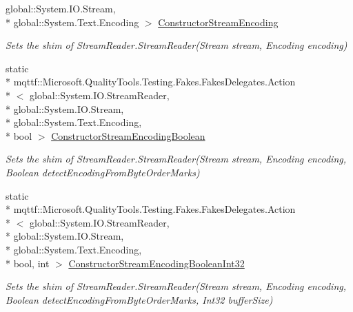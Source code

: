 \begin{DoxyCompactItemize}
global\-::\-System.\-I\-O.\-Stream, \\*
global\-::\-System.\-Text.\-Encoding $>$ \hyperlink{class_system_1_1_i_o_1_1_fakes_1_1_shim_stream_reader_a913bf2fa335f28d32c1b3d3026598281}{Constructor\-Stream\-Encoding}
\begin{DoxyCompactList}\small\item\em Sets the shim of Stream\-Reader.\-Stream\-Reader(\-Stream stream, Encoding encoding)\end{DoxyCompactList}\item 
static \\*
mqttf\-::\-Microsoft.\-Quality\-Tools.\-Testing.\-Fakes.\-Fakes\-Delegates.\-Action\\*
$<$ global\-::\-System.\-I\-O.\-Stream\-Reader, \\*
global\-::\-System.\-I\-O.\-Stream, \\*
global\-::\-System.\-Text.\-Encoding, \\*
bool $>$ \hyperlink{class_system_1_1_i_o_1_1_fakes_1_1_shim_stream_reader_a84bf251d745868706ef71b098b92f5e6}{Constructor\-Stream\-Encoding\-Boolean}
\begin{DoxyCompactList}\small\item\em Sets the shim of Stream\-Reader.\-Stream\-Reader(\-Stream stream, Encoding encoding, Boolean detect\-Encoding\-From\-Byte\-Order\-Marks)\end{DoxyCompactList}\item 
static \\*
mqttf\-::\-Microsoft.\-Quality\-Tools.\-Testing.\-Fakes.\-Fakes\-Delegates.\-Action\\*
$<$ global\-::\-System.\-I\-O.\-Stream\-Reader, \\*
global\-::\-System.\-I\-O.\-Stream, \\*
global\-::\-System.\-Text.\-Encoding, \\*
bool, int $>$ \hyperlink{class_system_1_1_i_o_1_1_fakes_1_1_shim_stream_reader_ad88c2bd5927a2385da93f423e6e7a998}{Constructor\-Stream\-Encoding\-Boolean\-Int32}
\begin{DoxyCompactList}\small\item\em Sets the shim of Stream\-Reader.\-Stream\-Reader(\-Stream stream, Encoding encoding, Boolean detect\-Encoding\-From\-Byte\-Order\-Marks, Int32 buffer\-Size)\end{DoxyCompactList}\item 

\end{DoxyCompactItemize}
